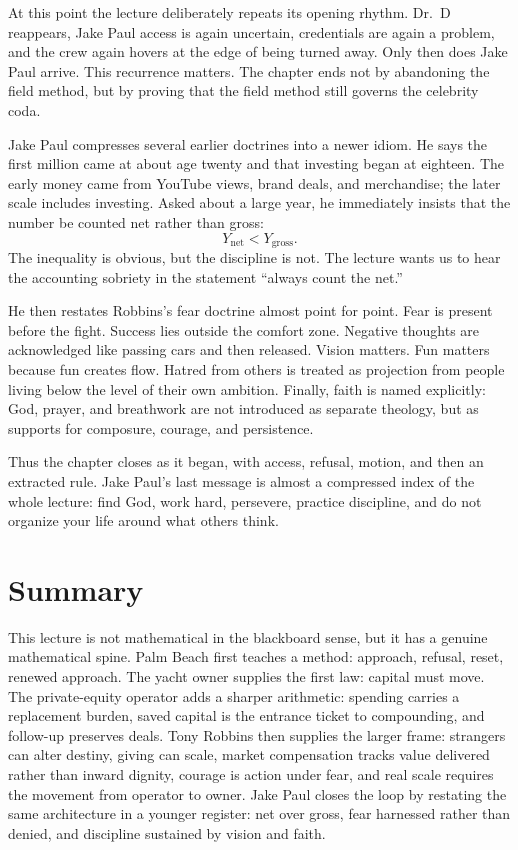 At this point the lecture deliberately repeats its opening rhythm. Dr.\ D reappears, Jake Paul access is again uncertain, credentials are again a problem, and the crew again hovers at the edge of being turned away. Only then does Jake Paul arrive. This recurrence matters. The chapter ends not by abandoning the field method, but by proving that the field method still governs the celebrity coda.

Jake Paul compresses several earlier doctrines into a newer idiom. He says the first million came at about age twenty and that investing began at eighteen. The early money came from YouTube views, brand deals, and merchandise; the later scale includes investing. Asked about a large year, he immediately insists that the number be counted net rather than gross:
\begin{equation}
Y_{\text{net}} < Y_{\text{gross}}.
\end{equation}
The inequality is obvious, but the discipline is not. The lecture wants us to hear the accounting sobriety in the statement ``always count the net.''

He then restates Robbins's fear doctrine almost point for point. Fear is present before the fight. Success lies outside the comfort zone. Negative thoughts are acknowledged like passing cars and then released. Vision matters. Fun matters because fun creates flow. Hatred from others is treated as projection from people living below the level of their own ambition. Finally, faith is named explicitly: God, prayer, and breathwork are not introduced as separate theology, but as supports for composure, courage, and persistence.

Thus the chapter closes as it began, with access, refusal, motion, and then an extracted rule. Jake Paul's last message is almost a compressed index of the whole lecture: find God, work hard, persevere, practice discipline, and do not organize your life around what others think.

\section{Summary}

This lecture is not mathematical in the blackboard sense, but it has a genuine mathematical spine. Palm Beach first teaches a method: approach, refusal, reset, renewed approach. The yacht owner supplies the first law: capital must move. The private-equity operator adds a sharper arithmetic: spending carries a replacement burden, saved capital is the entrance ticket to compounding, and follow-up preserves deals. Tony Robbins then supplies the larger frame: strangers can alter destiny, giving can scale, market compensation tracks value delivered rather than inward dignity, courage is action under fear, and real scale requires the movement from operator to owner. Jake Paul closes the loop by restating the same architecture in a younger register: net over gross, fear harnessed rather than denied, and discipline sustained by vision and faith.
